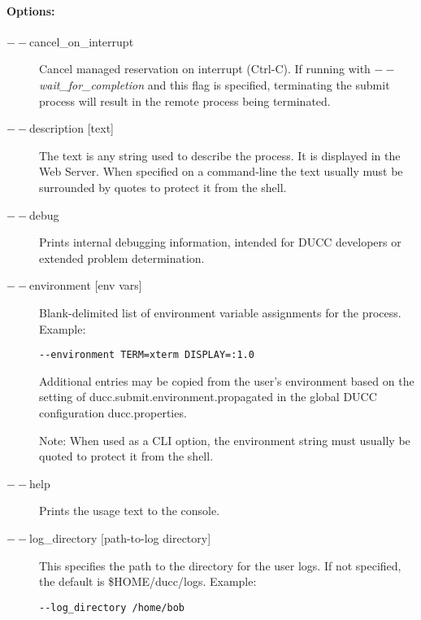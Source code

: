     \paragraph{Options:}
    \begin{description}
    
        \item[$--$cancel\_on\_interrupt ] Cancel managed reservation on interrupt
          (Ctrl-C).  If running with {\em $--$wait\_for\_completion} and this flag is specified,
          terminating the submit process will result in the remote process being terminated.

        \item[$--$description {[text]}] The text is any string used to describe the process. It is
          displayed in the Web Server. When specified on a command-line the text usually must be
          surrounded by quotes to protect it from the shell.

        \item[$--$debug ] Prints internal debugging information, intended for DUCC developers or
          extended problem determination.

        \item[$--$environment {[env vars]}] Blank-delimited list of environment variable
          assignments for the process. Example:
          \begin{verbatim}
--environment TERM=xterm DISPLAY=:1.0
          \end{verbatim}
             
          Additional entries may be copied from the user's environment based on the setting of
          ducc.submit.environment.propagated in the global DUCC configuration ducc.properties.

          Note: When used as a CLI option, the environment string must usually be
          quoted to protect it from the shell.

        \item[$--$help] Prints the usage text to the console.

        \item[$--$log\_directory {[path-to-log directory]} ]

          This specifies the path to the directory for the user logs. If not specified, the default
          is \$HOME/ducc/logs. Example: 
\begin{verbatim}
--log_directory /home/bob 
\end{verbatim}
          

\end{description}
